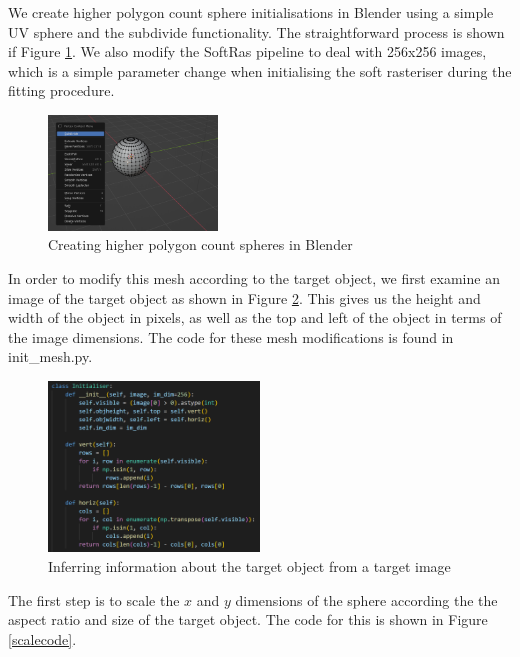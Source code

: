 \documentclass{article}
\begin{document}
We create higher polygon count sphere initialisations in Blender using a simple UV sphere and the subdivide functionality. The straightforward process is shown if Figure \ref{blender}. We also modify the SoftRas pipeline to deal with 256x256 images, which is a simple parameter change when initialising the soft rasteriser during the fitting procedure.

\begin{figure}[h!]
  \centering
  \includegraphics[width=0.4\textwidth]{images/blender.png}
  \caption{Creating higher polygon count spheres in Blender}
  \label{blender}
\end{figure}

In order to modify this mesh according to the target object, we first examine an image of the target object as shown in Figure \ref{imageeval}. This gives us the height and width of the object in pixels, as well as the top and left of the object in terms of the image dimensions. The code for these mesh modifications is found in init\_mesh.py.

\begin{figure}[h!]
  \centering
  \includegraphics[width=0.5\textwidth]{images/image_eval.png}
  \caption{Inferring information about the target object from a target image}
  \label{imageeval}
\end{figure}

The first step is to scale the $x$ and $y$ dimensions of the sphere according the the aspect ratio and size of the target object. The code for this is shown in Figure \ref{scalecode}.
\end{document}
